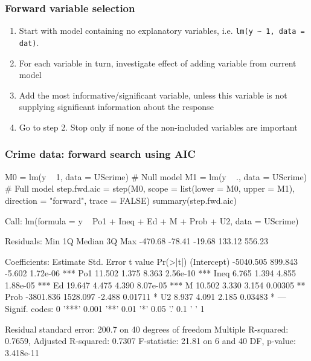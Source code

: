 \documentclass[a4paper]{article}
\begin{document}
\subsubsection{Forward variable selection}
\begin{enumerate}
	\item Start with model containing no explanatory variables, i.e. \lstinline|lm(y ~ 1, data = dat)|.
	\item For each variable in turn, investigate effect of adding variable from current model
	\item \textcolor{myred}{Add the most informative/significant variable}, unless this variable is not supplying significant information about the response
	\item Go to step 2. Stop only if none of the non-included variables are important
\end{enumerate}
\subsubsection{Crime data: forward search using AIC}
\begin{Schunk}
\begin{Sinput}
M0 = lm(y ~ 1, data = UScrime)  # Null model
M1 = lm(y ~ ., data = UScrime)  # Full model
step.fwd.aic = step(M0, scope = list(lower = M0, upper = M1),
                    direction = "forward", trace = FALSE)
summary(step.fwd.aic)
\end{Sinput}
\begin{Soutput}

Call:
lm(formula = y ~ Po1 + Ineq + Ed + M + Prob + U2, data = UScrime)

Residuals:
    Min      1Q  Median      3Q     Max 
-470.68  -78.41  -19.68  133.12  556.23 

Coefficients:
             Estimate Std. Error t value Pr(>|t|)    
(Intercept) -5040.505    899.843  -5.602 1.72e-06 ***
Po1            11.502      1.375   8.363 2.56e-10 ***
Ineq            6.765      1.394   4.855 1.88e-05 ***
Ed             19.647      4.475   4.390 8.07e-05 ***
M              10.502      3.330   3.154  0.00305 ** 
Prob        -3801.836   1528.097  -2.488  0.01711 *  
U2              8.937      4.091   2.185  0.03483 *  
---
Signif. codes:  0 '***' 0.001 '**' 0.01 '*' 0.05 '.' 0.1 ' ' 1

Residual standard error: 200.7 on 40 degrees of freedom
Multiple R-squared:  0.7659,	Adjusted R-squared:  0.7307 
F-statistic: 21.81 on 6 and 40 DF,  p-value: 3.418e-11
\end{Soutput}
\end{Schunk}
\end{document}
